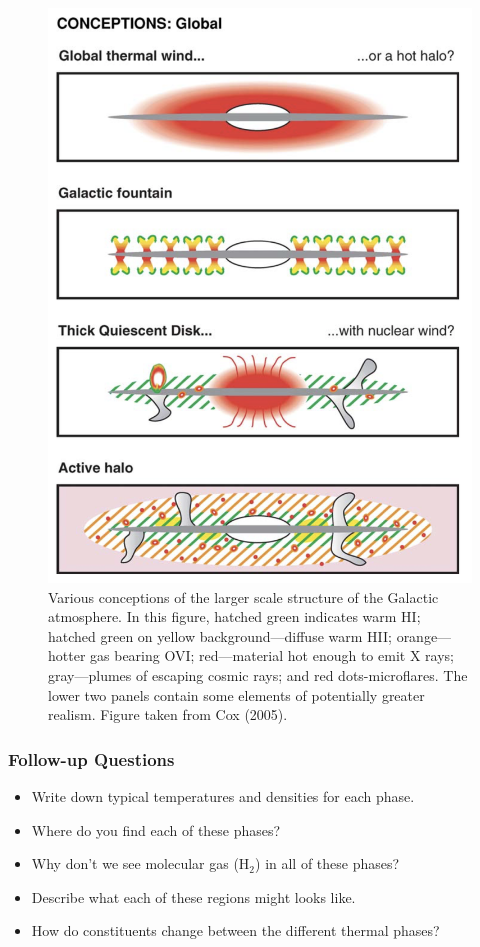 \documentclass[a4paper,10pt]{article}
\begin{document}
\begin{figure}[t!]
    \centering
    \includegraphics[width=14cm]{figures/ISM_global.png}
    \caption{\footnotesize{Various conceptions of the larger scale structure of the Galactic atmosphere. In this figure, hatched green indicates warm HI; hatched green on yellow background—diffuse warm HII; orange—hotter gas bearing OVI; red—material hot enough to emit X rays; gray—plumes of escaping cosmic rays; and red dots-microflares. The lower two panels contain some elements of potentially greater realism. Figure taken from Cox (2005).}}
    \label{fig:ISMglobal}
\end{figure}

\newpage
\subsubsection{Follow-up Questions}

\begin{itemize}
    \item Write down typical temperatures and densities for each phase.
    \item Where do you find each of these phases?
    \item Why don't we see molecular gas (H$_2$) in all of these phases?
    \item Describe what each of these regions might looks like.
    \item How do constituents change between the different thermal phases?
\end{itemize}
\end{document}
